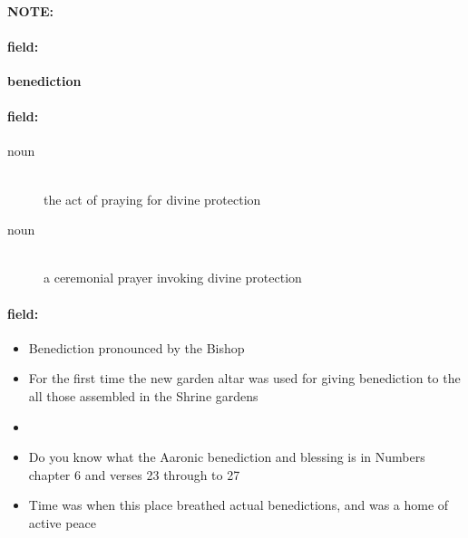 \documentclass[12pt]{article}
\newenvironment{note}{\paragraph{NOTE:}}{}
\newenvironment{field}{\paragraph{field:}}{}
\begin{document}
\begin{note}
\begin{field}
\textbf{\large benediction}
\end{field}


\begin{field}
\begin{description}
\item[noun] \hfill \\ 
the act of praying for divine protection

\item[noun] \hfill \\ 
a ceremonial prayer invoking divine protection

\end{description}
\end{field}

\begin{field}
\begin{itemize}
\item Benediction pronounced by the Bishop
\item For the first time the new garden altar was used for giving benediction to the all those assembled in the Shrine gardens
\item 
\item Do you know what the Aaronic benediction and blessing is in Numbers chapter 6 and verses 23 through to 27
\item Time was when this place breathed actual benedictions, and was a home of active peace
\end{itemize}
\end{field}
\end{note}
\end{document}
